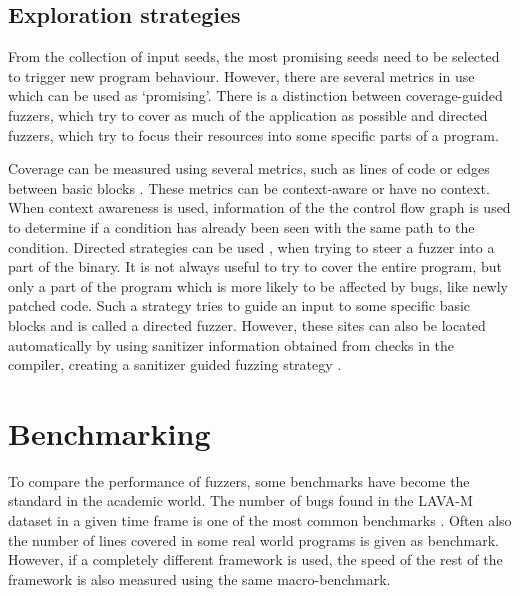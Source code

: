 \subsection{Exploration strategies}\label{subsect:exploration-strategies}
From the collection of input seeds, the most promising seeds need to be selected to trigger new program behaviour.
However, there are several metrics in use which can be used as `promising'. There is a distinction between coverage-guided fuzzers, which try to cover as much of the application as possible and directed fuzzers, which try to focus their resources into some specific parts of a program. 

Coverage can be measured using several metrics, such as lines of code \cite{zeller2019fuzzing} or edges between basic blocks \cite{rawat2017vuzzer}. 
These metrics can be context-aware or have no context. When context awareness is used, information of the the control flow graph is used to determine if a condition has already been seen with the same path to the condition. %
Directed strategies can be used \cite{chen2018hawkeye}, when trying to steer a fuzzer into a part of the binary. It is not always useful to try to cover the entire program, but only a part of the program which is more likely to be affected by bugs, like newly patched code.  Such a strategy tries to guide an input to some specific basic blocks and is called a directed fuzzer. However, these sites can also be located automatically by using sanitizer information obtained from checks in the compiler, creating a sanitizer guided fuzzing strategy \cite{osterlund2020parmesan}. 

\section{Benchmarking}\label{sec:benchmarking}
To compare the performance of fuzzers, some benchmarks have become the standard in the academic world. The number of bugs found in the LAVA-M dataset in a given time frame is one of the most common benchmarks \cite{dolan2016lava}. Often also the number of lines covered in some real world programs is given as benchmark. However, if a completely different framework is used, the speed of the rest of the framework is also measured using the same macro-benchmark.

